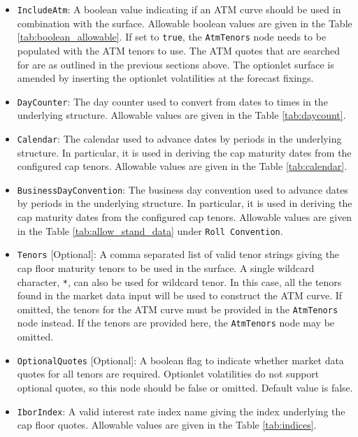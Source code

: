 \begin{itemize}
\item \lstinline!IncludeAtm!:
A boolean value indicating if an ATM curve should be used in combination with the surface. Allowable boolean values are given in the Table \ref{tab:boolean_allowable}. If set to \lstinline!true!, the \lstinline!AtmTenors! node needs to be populated with the ATM tenors to use. The ATM quotes that are searched for are as outlined in the previous sections above. The optionlet surface is amended by inserting the optionlet volatilities at the forecast fixings.

\item \lstinline!DayCounter!:
The day counter used to convert from dates to times in the underlying structure. Allowable values are given in the Table \ref{tab:daycount}.

\item \lstinline!Calendar!:
The calendar used to advance dates by periods in the underlying structure. In particular, it is used in deriving the cap maturity dates from the configured cap tenors. Allowable values are given in the Table \ref{tab:calendar}.

\item \lstinline!BusinessDayConvention!:
The business day convention used to advance dates by periods in the underlying structure. In particular, it is used in deriving the cap maturity dates from the configured cap tenors. Allowable values are given in the Table \ref{tab:allow_stand_data} under \lstinline!Roll Convention!.

\item \lstinline!Tenors! [Optional]:
A comma separated list of valid tenor strings giving the cap floor maturity tenors to be used in the surface. A single wildcard character, \lstinline!*!, can also be used for wildcard tenor. In this case, all the tenors found in the market data input will be used to construct the ATM curve. If omitted, the tenors for the ATM curve must be provided in the \lstinline!AtmTenors! node instead. If the tenors are provided here, the \lstinline!AtmTenors! node may be omitted.

\item \lstinline!OptionalQuotes! [Optional]:
A boolean flag to indicate whether market data quotes for all tenors are required. Optionlet volatilities do not support optional quotes, so this node should be false or omitted. Default value is false.

\item \lstinline!IborIndex!:
A valid interest rate index name giving the index underlying the cap floor quotes. Allowable values are given in the Table \ref{tab:indices}.


\end{itemize}
